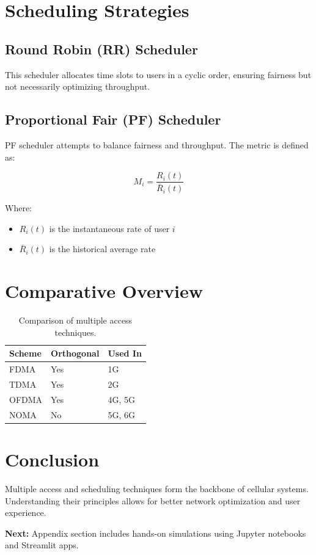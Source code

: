 \section{Scheduling Strategies}

\subsection{Round Robin (RR) Scheduler}
This scheduler allocates time slots to users in a cyclic order, ensuring fairness but not necessarily optimizing throughput.

\subsection{Proportional Fair (PF) Scheduler}
PF scheduler attempts to balance fairness and throughput. The metric is defined as:

\begin{equation}
M_i = \frac{R_i(t)}{\bar{R}_i(t)}
\end{equation}

Where:
\begin{itemize}
  \item $R_i(t)$ is the instantaneous rate of user $i$
  \item $\bar{R}_i(t)$ is the historical average rate
\end{itemize}

\section{Comparative Overview}

\begin{table}[H]
\centering
\begin{tabular}{|l|l|l|}
\hline
\textbf{Scheme} & \textbf{Orthogonal} & \textbf{Used In} \\
\hline
FDMA & Yes & 1G \\
TDMA & Yes & 2G \\
OFDMA & Yes & 4G, 5G \\
NOMA & No & 5G, 6G \\
\hline
\end{tabular}
\caption{Comparison of multiple access techniques.}
\end{table}

\section{Conclusion}
Multiple access and scheduling techniques form the backbone of cellular systems. Understanding their principles allows for better network optimization and user experience.

\vspace{1em}
\noindent\textbf{Next:} Appendix section includes hands-on simulations using Jupyter notebooks and Streamlit apps.

